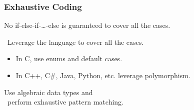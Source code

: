 \begin{frame}

\frametitle{Exhaustive Coding}

\begin{center}

No if-else-if-\ldots-else is guaranteed to cover all the cases.

\end{center}

\vspace{\fill}

\begin{center}

\leftthumbsup~Leverage the language to cover all the cases.~\rightthumbsup

\end{center}

\vspace{\fill}

\begin{itemize}

\item In C, use enums and default cases.

\item In C++, C\#, Java, Python, etc. leverage polymorphism.

\end{itemize}

\vspace{\fill}

\pause

\begin{center}

Use algebraic data types and \\ \leftthumbsup~perform exhaustive pattern
matching.~\rightthumbsup


\end{center}

\end{frame}
